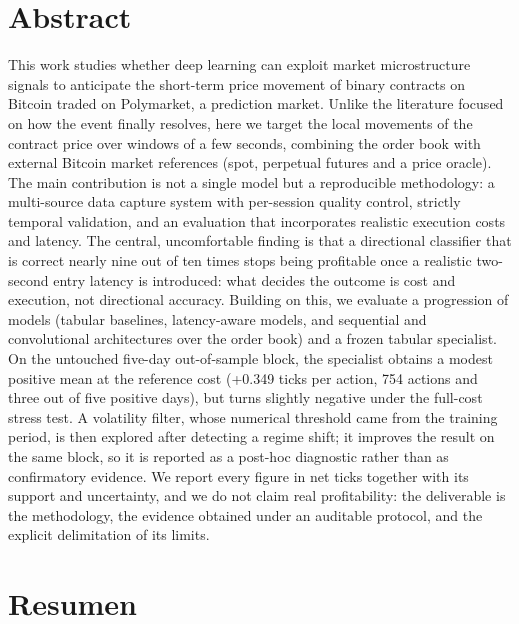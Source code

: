 %

\section*{Abstract}
\label{sec::abstract}

This work studies whether deep learning can exploit market microstructure signals to
anticipate the short-term price movement of binary contracts on Bitcoin traded on
Polymarket, a prediction market. Unlike the literature focused on how the event finally
resolves, here we target the local movements of the contract price over windows of a few
seconds, combining the order book with external Bitcoin market references (spot, perpetual
futures and a price oracle). The main contribution is not a single model but a
reproducible methodology: a multi-source data capture system with per-session quality
control, strictly temporal validation, and an evaluation that incorporates realistic
execution costs and latency. The central, uncomfortable finding is that a directional
classifier that is correct nearly nine out of ten times stops being profitable once a
realistic two-second entry latency is introduced: what decides the outcome is cost and
execution, not directional accuracy. Building on this, we evaluate a progression of models
(tabular baselines, latency-aware models, and sequential and convolutional architectures
over the order book) and a frozen tabular specialist. On the untouched five-day
out-of-sample block, the specialist obtains a modest positive mean at the reference cost
(+0.349 ticks per action, 754 actions and three out of five positive days), but turns
slightly negative under the full-cost stress test. A volatility filter, whose numerical
threshold came from the training period, is then explored after detecting a regime shift;
it improves the result on the same block, so it is reported as a post-hoc diagnostic rather
than as confirmatory evidence. We report every figure in net ticks together with its support
and uncertainty, and we do not claim real profitability: the deliverable is the
methodology, the evidence obtained under an auditable protocol, and the explicit
delimitation of its limits.

\newpage
\section*{Resumen}
\label{sec::resumen}

